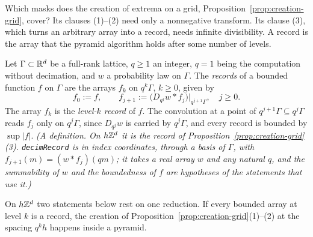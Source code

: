 Which masks does the creation of extrema on a grid, Proposition~\ref{prop:creation-grid}, cover?
Its clauses (1)--(2) need only a nonnegative transform. Its clause (3), which turns an arbitrary
array into a record, needs infinite divisibility. A record is the array that the pyramid algorithm
holds after some number of levels.

\begin{definition}
\label{def:level-records}
\leanok
{}
Let $\Gamma \subset \mathbb{R}^d$ be a full-rank lattice, $q \ge 1$ an integer, $q = 1$ being the computation without decimation, and $w$ a probability law on
$\Gamma$. The \emph{records} of a bounded function $f$ on $\Gamma$ are the arrays $f_k$ on
$q^k\Gamma$, $k \ge 0$, given by
\[
f_0 := f, \qquad f_{j+1} := \bigl(D_{q^j}w * f_j\bigr)\big|_{q^{j+1}\Gamma}, \quad j \ge 0 .
\]
The array $f_k$ is the \emph{level-$k$ record} of $f$. The convolution at a point of
$q^{j+1}\Gamma \subseteq q^j\Gamma$ reads $f_j$ only on $q^j\Gamma$, since $D_{q^j}w$ is carried by
$q^j\Gamma$, and every record is bounded by $\sup|f|$.
\statusT\quad\emph{(A definition. On $h\mathbb{Z}^d$ it is the record of
Proposition~\ref{prop:creation-grid}(3). \texttt{decimRecord} is in index coordinates, through a
basis of $\Gamma$, with $f_{j+1}(m) = (w * f_j)(qm)$; it takes a real array $w$ and any natural
$q$, and the summability of $w$ and the boundedness of $f$ are hypotheses of the statements that
use it.)}
\end{definition}

On $h\mathbb{Z}^d$ two statements below rest on one reduction. If every bounded array at level $k$ is a
record, the creation of Proposition~\ref{prop:creation-grid}(1)--(2) at the spacing $q^kh$ happens
inside a pyramid.

